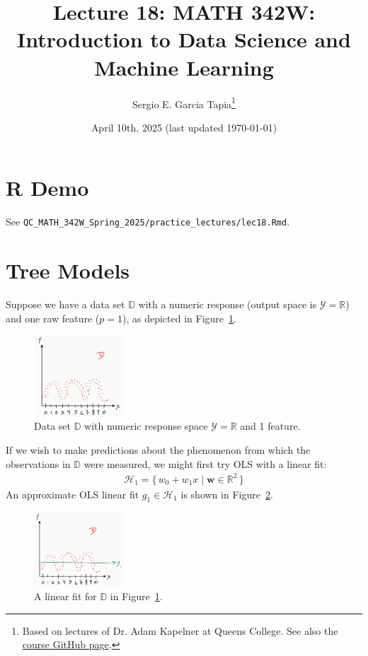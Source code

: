 \documentclass[12pt, a4paper]{article}
\title{Lecture 18: MATH 342W: Introduction to Data Science and Machine Learning}
\author{Sergio E. Garcia Tapia\thanks{Based on lectures of Dr. Adam Kapelner at Queens College.
See also the \href{https://github.com/kapelner/QC_MATH_342W_Spring_2025}{course GitHub page}.}}
\date{April 10th, 2025 (last updated \today)}
\theoremstyle{definition}
\begin{document}
	\maketitle
	\section*{R Demo}
	See \verb|QC_MATH_342W_Spring_2025/practice_lectures/lec18.Rmd|.
	\section*{Tree Models}
	Suppose we have a data set $\mathbb{D}$ with a numeric response (output space
	is $\mathcal{Y}=\mathbb{R}$) and one raw feature ($p = 1$), as depicted in 
	Figure~\ref{fig:data-set-numeric-response-1-feature}.
	\begin{figure}
		\centering
		\includegraphics[width=0.3\textwidth]{data-set-numeric-response-1-feature}
		\caption{Data set $\mathbb{D}$ with numeric response space $\mathcal{Y}=\mathbb{R}$
			and 1 feature.}
		\label{fig:data-set-numeric-response-1-feature}
	\end{figure}
	If we wish to make predictions about the phenomenon from which the observations
	in $\mathbb{D}$ were measured, we might first try OLS with a linear fit:
	\begin{align*}
		\mathcal{H}_1 = \{\,
		w_0 + w_1 x \mid \bm{w}\in \mathbb{R}^2
		\,\}
	\end{align*}
	An approximate OLS linear fit $g_1\in \mathcal{H}_1$ is shown in
	Figure~\ref{fig:data-set-numeric-response-1-feature-linear}.
	\begin{figure}
		\centering
		\includegraphics[width=0.3\textwidth]{data-set-numeric-response-1-feature-ols-linear}
		\caption{A linear fit for $\mathbb{D}$ in Figure~\ref{fig:data-set-numeric-response-1-feature}.}
		\label{fig:data-set-numeric-response-1-feature-linear}
	\end{figure}
\end{document}

